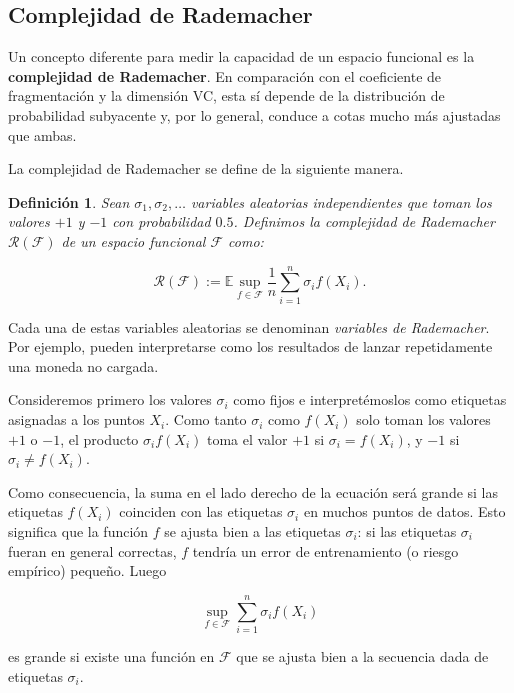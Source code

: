 \documentclass{report}
\newtheorem{dfn}{Definición}[subsection]
\begin{document}
\subsection{Complejidad de Rademacher}
Un concepto diferente para medir la capacidad de un espacio funcional es la \textbf{complejidad de Rademacher}. 
En comparación con el coeficiente de fragmentación y la dimensión VC, esta sí depende de la distribución de 
probabilidad subyacente y, por lo general, conduce a cotas mucho más ajustadas que ambas.\newline

La complejidad de Rademacher se define de la siguiente manera.\newline

\begin{dfn}
Sean \(\sigma_1, \sigma_2, \dots\) variables aleatorias independientes que toman los valores \(+1\) y \(-1\) 
con probabilidad \(0.5\). Definimos la complejidad de Rademacher \(\mathscr{R}(\mathcal{F})\) de un espacio funcional 
\(\mathcal{F}\) como:

\[
    \mathscr{R}(\mathcal{F}) := \mathbb{E} \sup_{f \in \mathcal{F}} \frac{1}{n} \sum_{i=1}^{n} \sigma_i f(X_i).
\]
\end{dfn}

Cada una de estas variables aleatorias se denominan \textit{variables de Rademacher}. 
Por ejemplo, pueden interpretarse como los resultados de lanzar repetidamente una moneda no cargada. 

Consideremos primero los valores \(\sigma_i\) como fijos e interpretémoslos como etiquetas asignadas a los puntos \(X_i\). Como tanto 
\(\sigma_i\) como \(f(X_i)\) solo toman los valores \(+1\) o \(-1\), el producto \(\sigma_i f(X_i)\) toma el 
valor \(+1\) si \(\sigma_i = f(X_i)\), y \(-1\) si \(\sigma_i \neq f(X_i)\). \newline

Como consecuencia, la suma en el lado derecho de la ecuación será grande si las etiquetas \(f(X_i)\) 
coinciden con las etiquetas \(\sigma_i\) en muchos puntos de datos. Esto significa que la función \(f\) 
se ajusta bien a las etiquetas \(\sigma_i\): si las etiquetas \(\sigma_i\) fueran en general correctas, 
\(f\) tendría un error de entrenamiento (o riesgo empírico) pequeño. Luego

\[
\sup_{f \in \mathcal{F}} \sum_{i=1}^{n} \sigma_i f(X_i)
\]

es grande si existe una función en \(\mathcal{F}\) que se ajusta bien a la secuencia dada de etiquetas \(\sigma_i\). \newline
\end{document}

